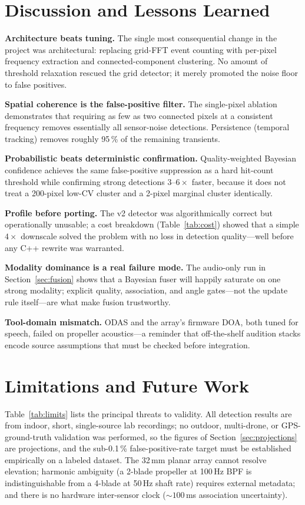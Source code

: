 \documentclass[conference]{IEEEtran}
\begin{document}
\section{Discussion and Lessons Learned}
\textbf{Architecture beats tuning.} The single most consequential change
in the project was architectural: replacing grid-FFT event counting with
per-pixel frequency extraction and connected-component clustering. No
amount of threshold relaxation rescued the grid detector; it merely
promoted the noise floor to false positives.

\textbf{Spatial coherence is the false-positive filter.} The
single-pixel ablation demonstrates that requiring as few as two connected
pixels at a consistent frequency removes essentially all sensor-noise
detections. Persistence (temporal tracking) removes roughly 95\,\% of the
remaining transients.

\textbf{Probabilistic beats deterministic confirmation.} Quality-weighted
Bayesian confidence achieves the same false-positive suppression as a
hard hit-count threshold while confirming strong detections $3$--$6\times$
faster, because it does not treat a 200-pixel low-CV cluster and a
2-pixel marginal cluster identically.

\textbf{Profile before porting.} The v2 detector was algorithmically
correct but operationally unusable; a cost breakdown
(Table~\ref{tab:cost}) showed that a simple $4\times$ downscale solved
the problem with no loss in detection quality---well before any C++
rewrite was warranted.

\textbf{Modality dominance is a real failure mode.} The audio-only run
in Section~\ref{sec:fusion} shows that a Bayesian fuser will happily
saturate on one strong modality; explicit quality, association, and angle
gates---not the update rule itself---are what make fusion trustworthy.

\textbf{Tool-domain mismatch.} ODAS and the array's firmware DOA, both
tuned for speech, failed on propeller acoustics---a reminder that
off-the-shelf audition stacks encode source assumptions that must be
checked before integration.

\section{Limitations and Future Work}
\label{sec:future}
Table~\ref{tab:limits} lists the principal threats to validity. All
detection results are from indoor, short, single-source lab recordings;
no outdoor, multi-drone, or GPS-ground-truth validation was performed,
so the figures of Section~\ref{sec:projections} are projections, and the
sub-0.1\,\% false-positive-rate target must be established empirically
on a labeled dataset. The 32\,mm planar array cannot resolve elevation;
harmonic ambiguity (a 2-blade propeller at 100\,Hz BPF is
indistinguishable from a 4-blade at 50\,Hz shaft rate) requires external
metadata; and there is no hardware inter-sensor clock (${\sim}100$\,ms
association uncertainty).
\end{document}
